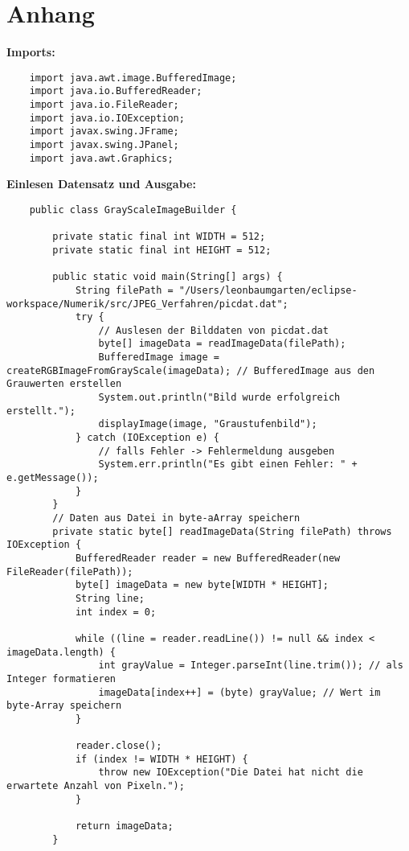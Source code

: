 \documentclass[12pt]{article}
\begin{document}
		\section{Anhang}
\textbf{Imports:}
\begin{lstlisting}
	import java.awt.image.BufferedImage;
	import java.io.BufferedReader;
	import java.io.FileReader;
	import java.io.IOException;
	import javax.swing.JFrame;
	import javax.swing.JPanel;
	import java.awt.Graphics;
\end{lstlisting} 
	\vspace{0.5cm}
\textbf{Einlesen Datensatz und Ausgabe:}
\begin{lstlisting}
	public class GrayScaleImageBuilder {
		
		private static final int WIDTH = 512;
		private static final int HEIGHT = 512;
		
		public static void main(String[] args) {
			String filePath = "/Users/leonbaumgarten/eclipse-workspace/Numerik/src/JPEG_Verfahren/picdat.dat";
			try {
				// Auslesen der Bilddaten von picdat.dat
				byte[] imageData = readImageData(filePath);
				BufferedImage image = createRGBImageFromGrayScale(imageData); // BufferedImage aus den Grauwerten erstellen
				System.out.println("Bild wurde erfolgreich erstellt.");
				displayImage(image, "Graustufenbild");
			} catch (IOException e) {
				// falls Fehler -> Fehlermeldung ausgeben
				System.err.println("Es gibt einen Fehler: " + e.getMessage());
			}
		}
		// Daten aus Datei in byte-aArray speichern
		private static byte[] readImageData(String filePath) throws IOException {
			BufferedReader reader = new BufferedReader(new FileReader(filePath));
			byte[] imageData = new byte[WIDTH * HEIGHT];
			String line;
			int index = 0;
			
			while ((line = reader.readLine()) != null && index < imageData.length) {
				int grayValue = Integer.parseInt(line.trim()); // als Integer formatieren
				imageData[index++] = (byte) grayValue; // Wert im byte-Array speichern
			}
			
			reader.close();
			if (index != WIDTH * HEIGHT) {
				throw new IOException("Die Datei hat nicht die erwartete Anzahl von Pixeln.");
			}
			
			return imageData;
		}
		

\end{lstlisting}
\end{document}
